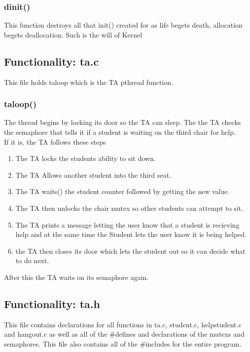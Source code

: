 \documentclass[11pt]{article}
\begin{document}
\subsubsection {dinit()}
This function destroys all that init() created for as life begets death, allocation begets deallocation. Such is the will of Kernel

\subsection{Functionality: ta.c}
This file holds ta\textunderscore loop which is the TA pthread function. 

\subsubsection{ ta\textunderscore loop()}
The thread begins by locking its door so the TA can sleep. The the TA checks the semaphore that tells it if a student is waiting on the third chair for help.\\
 If it is, the TA follows these steps
 \begin{enumerate}
 	\item The TA locks the students ability to sit down.
 	\item The TA Allows another student into the third seat.
 	\item The TA waits() the student counter followed by getting the new value.
 	\item The TA then unlocks the chair mutex so other students can attempt to sit.
 	\item The TA prints a message letting the user know that a student is recieving help and at the same time the Student lets the user know it is being helped.
 	\item the TA then closes its door which lets the student out so it can decide what to do next. 
 \end{enumerate}

After this the TA waits on its semaphore again.

\subsection{Functionality: ta.h}
This file contains declarations for all functions in ta.c, student.c, help\textunderscore student.c and hangout.c as well as all of the \#defines and declarations of the mutexs and semaphores. This file also contains all of the \#includes for the entire program.
\end{document}
